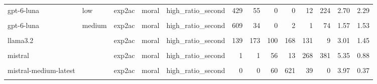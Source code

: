\documentclass[
]{article}
\begin{document}
\begin{table}[!h]
{\begin{tabular}[t]{lllllrrrrrrrr}
gpt-6-luna & low & exp2ac & moral & high\_ratio\_second & 429 & 55 & 0 & 0 & 12 & 224 & 2.70 & 2.29\\
\cellcolor{gray!10}{gpt-6-luna} & \cellcolor{gray!10}{medium} & \cellcolor{gray!10}{exp2ac} & \cellcolor{gray!10}{moral} & \cellcolor{gray!10}{high\_ratio\_first} & \cellcolor{gray!10}{640} & \cellcolor{gray!10}{34} & \cellcolor{gray!10}{2} & \cellcolor{gray!10}{0} & \cellcolor{gray!10}{0} & \cellcolor{gray!10}{44} & \cellcolor{gray!10}{1.36} & \cellcolor{gray!10}{1.21}\\
gpt-6-luna & medium & exp2ac & moral & high\_ratio\_second & 609 & 34 & 0 & 2 & 1 & 74 & 1.57 & 1.53\\
\addlinespace
\cellcolor{gray!10}{llama3.2} & \cellcolor{gray!10}{} & \cellcolor{gray!10}{exp2ac} & \cellcolor{gray!10}{moral} & \cellcolor{gray!10}{high\_ratio\_first} & \cellcolor{gray!10}{27} & \cellcolor{gray!10}{124} & \cellcolor{gray!10}{164} & \cellcolor{gray!10}{124} & \cellcolor{gray!10}{181} & \cellcolor{gray!10}{100} & \cellcolor{gray!10}{3.84} & \cellcolor{gray!10}{1.43}\\
llama3.2 &  & exp2ac & moral & high\_ratio\_second & 139 & 173 & 100 & 168 & 131 & 9 & 3.01 & 1.45\\
\cellcolor{gray!10}{mistral} & \cellcolor{gray!10}{} & \cellcolor{gray!10}{exp2ac} & \cellcolor{gray!10}{moral} & \cellcolor{gray!10}{high\_ratio\_first} & \cellcolor{gray!10}{495} & \cellcolor{gray!10}{162} & \cellcolor{gray!10}{0} & \cellcolor{gray!10}{63} & \cellcolor{gray!10}{0} & \cellcolor{gray!10}{0} & \cellcolor{gray!10}{1.49} & \cellcolor{gray!10}{0.88}\\
mistral &  & exp2ac & moral & high\_ratio\_second & 1 & 1 & 56 & 13 & 268 & 381 & 5.35 & 0.88\\
\cellcolor{gray!10}{mistral-medium-latest} & \cellcolor{gray!10}{} & \cellcolor{gray!10}{exp2ac} & \cellcolor{gray!10}{moral} & \cellcolor{gray!10}{high\_ratio\_first} & \cellcolor{gray!10}{0} & \cellcolor{gray!10}{97} & \cellcolor{gray!10}{588} & \cellcolor{gray!10}{35} & \cellcolor{gray!10}{0} & \cellcolor{gray!10}{0} & \cellcolor{gray!10}{2.91} & \cellcolor{gray!10}{0.42}\\
\addlinespace
mistral-medium-latest &  & exp2ac & moral & high\_ratio\_second & 0 & 0 & 60 & 621 & 39 & 0 & 3.97 & 0.37\\
\cellcolor{gray!10}{mistral-nemo} & \cellcolor{gray!10}{} & \cellcolor{gray!10}{exp2ac} & \cellcolor{gray!10}{moral} & \cellcolor{gray!10}{high\_ratio\_first} & \cellcolor{gray!10}{0} & \cellcolor{gray!10}{50} & \cellcolor{gray!10}{313} & \cellcolor{gray!10}{351} & \cellcolor{gray!10}{6} & \cellcolor{gray!10}{0} & \cellcolor{gray!10}{3.43} & \cellcolor{gray!10}{0.63}\\

\end{tabular}}
\end{table}
\end{document}
